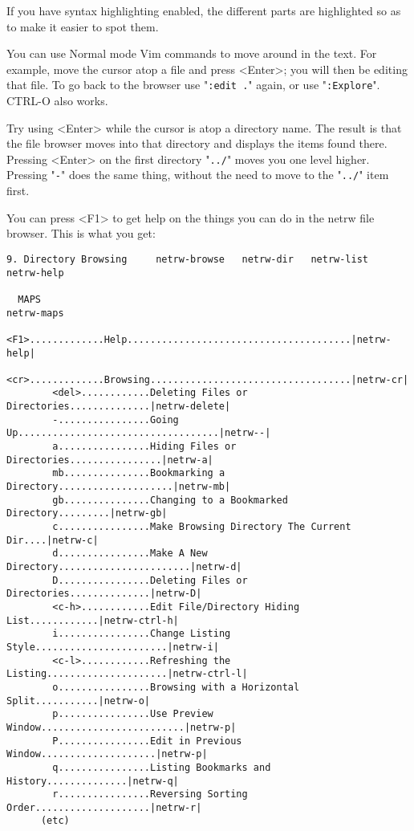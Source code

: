 If you have syntax highlighting enabled, the different parts are highlighted so as to make it easier to spot them.

You can use Normal mode Vim commands to move around in the text.
For example, move the cursor atop a file and press <Enter>; you will then be editing that file.
To go back to the browser use "\texttt{:edit .}" again, or use "\texttt{:Explore}".
CTRL-O also works.

Try using <Enter> while the cursor is atop a directory name.
The result is that the file browser moves into that directory and displays the items found there.
Pressing <Enter> on the first directory "\texttt{../}" moves you one level higher.
Pressing "\texttt{-}" does the same thing, without the need to move to the "\texttt{../}" item first.

You can press <F1> to get help on the things you can do in the netrw file browser.
This is what you get:
\begin{Verbatim}[samepage=true]
  9. Directory Browsing     netrw-browse   netrw-dir   netrw-list   netrw-help 

  MAPS                                                                  netrw-maps 
        <F1>.............Help.......................................|netrw-help|
        <cr>.............Browsing...................................|netrw-cr|
        <del>............Deleting Files or Directories..............|netrw-delete|
        -................Going Up...................................|netrw--|
        a................Hiding Files or Directories................|netrw-a|
        mb...............Bookmarking a Directory....................|netrw-mb|
        gb...............Changing to a Bookmarked Directory.........|netrw-gb|
        c................Make Browsing Directory The Current Dir....|netrw-c|
        d................Make A New Directory.......................|netrw-d|
        D................Deleting Files or Directories..............|netrw-D|
        <c-h>............Edit File/Directory Hiding List............|netrw-ctrl-h|
        i................Change Listing Style.......................|netrw-i|
        <c-l>............Refreshing the Listing.....................|netrw-ctrl-l|
        o................Browsing with a Horizontal Split...........|netrw-o|
        p................Use Preview Window.........................|netrw-p|
        P................Edit in Previous Window....................|netrw-p|
        q................Listing Bookmarks and History..............|netrw-q|
        r................Reversing Sorting Order....................|netrw-r|
      (etc)
\end{Verbatim}

